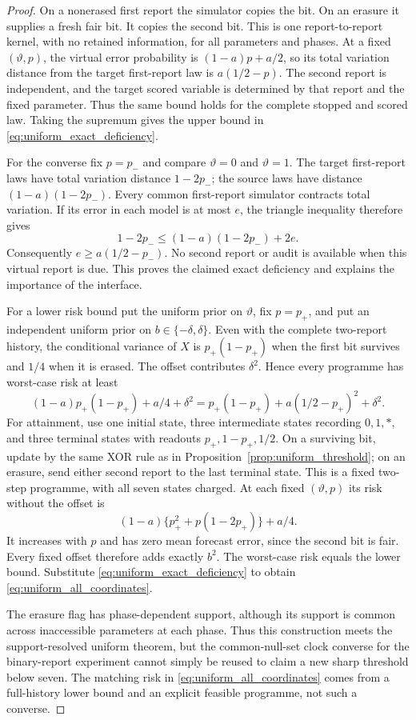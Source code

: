 \begin{proof}
On a nonerased first report the simulator copies the bit. On an erasure it supplies a fresh fair bit. It copies the second bit. This is one report-to-report kernel, with no retained information, for all parameters and phases. At a fixed $(\vartheta,p)$, the virtual error probability is $(1-a)p+a/2$, so its total variation distance from the target first-report law is $a(1/2-p)$. The second report is independent, and the target scored variable is determined by that report and the fixed parameter. Thus the same bound holds for the complete stopped and scored law. Taking the supremum gives the upper bound in \eqref{eq:uniform_exact_deficiency}.

For the converse fix $p=p_-$ and compare $\vartheta=0$ and $\vartheta=1$. The target first-report laws have total variation distance $1-2p_-$; the source laws have distance $(1-a)(1-2p_-)$. Every common first-report simulator contracts total variation. If its error in each model is at most $e$, the triangle inequality therefore gives
\[
 1-2p_-\le (1-a)(1-2p_-)+2e.
\]
Consequently $e\ge a(1/2-p_-)$. No second report or audit is available when this virtual report is due. This proves the claimed exact deficiency and explains the importance of the interface.

For a lower risk bound put the uniform prior on $\vartheta$, fix $p=p_+$, and put an independent uniform prior on $b\in\{-\delta,\delta\}$. Even with the complete two-report history, the conditional variance of $X$ is $p_+(1-p_+)$ when the first bit survives and $1/4$ when it is erased. The offset contributes $\delta^2$. Hence every programme has worst-case risk at least
\[
 (1-a)p_+(1-p_+)+a/4+\delta^2
 =p_+(1-p_+)+a(1/2-p_+)^2+\delta^2.
\]
For attainment, use one initial state, three intermediate states recording $0,1,*$, and three terminal states with readouts $p_+,1-p_+,1/2$. On a surviving bit, update by the same XOR rule as in Proposition~\ref{prop:uniform_threshold}; on an erasure, send either second report to the last terminal state. This is a fixed two-step programme, with all seven states charged. At each fixed $(\vartheta,p)$ its risk without the offset is
\[
 (1-a)\{p_+^2+p(1-2p_+)\}+a/4.
\]
It increases with $p$ and has zero mean forecast error, since the second bit is fair. Every fixed offset therefore adds exactly $b^2$. The worst-case risk equals the lower bound. Substitute \eqref{eq:uniform_exact_deficiency} to obtain \eqref{eq:uniform_all_coordinates}.

The erasure flag has phase-dependent support, although its support is common across inaccessible parameters at each phase. Thus this construction meets the support-resolved uniform theorem, but the common-null-set clock converse for the binary-report experiment cannot simply be reused to claim a new sharp threshold below seven. The matching risk in \eqref{eq:uniform_all_coordinates} comes from a full-history lower bound and an explicit feasible programme, not such a converse.
\end{proof}
